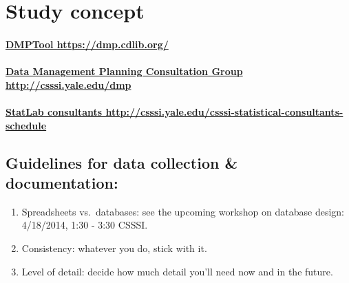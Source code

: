 \documentclass{tufte-handout}
\begin{document}
\newpage

\vspace*{-50pt}
\section{Study concept}\label{study-concept}

\paragraph{\href{https://dmp.cdlib.org/}{DMPTool https://dmp.cdlib.org/}}\label{dmptool}

\paragraph{\href{http://csssi.yale.edu/dmp}{Data Management Planning Consultation
Group http://csssi.yale.edu/dmp}}\label{dmp-consultation-group}

\paragraph{\href{http://csssi.yale.edu/csssi-statistical-consultants-schedule}{StatLab
consultants http://csssi.yale.edu/csssi-statistical-consultants-schedule} }\label{statlab-consultants}

\marginnote
{\subsection{Guidelines for data collection \& documentation:}\label{guidelines-doc}
\begin{enumerate}
\def\labelenumi{\arabic{enumi}.}
\itemsep1pt\parskip0pt
\item
  Spreadsheets vs.~databases: see the upcoming workshop on database
  design: 4/18/2014, 1:30 - 3:30 CSSSI.
\item
  Consistency: whatever you do, stick with it.
\item
  Level of detail: decide how much detail you'll need now and in the
  future.
\end{enumerate}}
\end{document}
